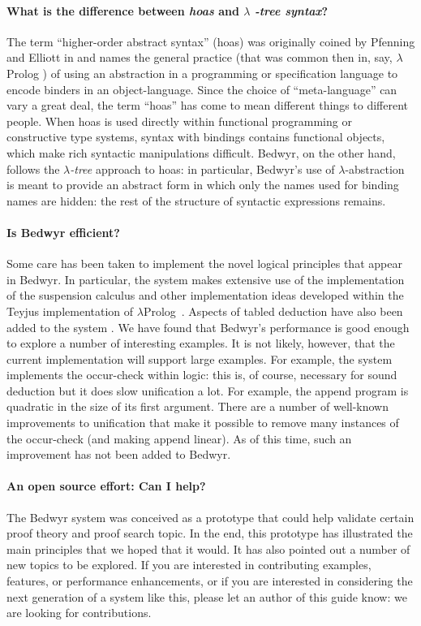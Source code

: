 \documentclass{article}
\newcommand{\lp}{$\lambda$Prolog}
\begin{document}
\paragraph{What is the difference between {\em hoas} and $\lambda${\em
    -tree syntax}?}
The term ``higher-order abstract syntax'' (hoas) was originally coined
by Pfenning and Elliott in \cite{pfenning88pldi} and names the general
practice (that was common then in, say, $\lambda$Prolog
\cite{miller87slp}) of using an abstraction in a programming or
specification language to encode binders in an object-language.  Since
the choice of ``meta-language'' can vary a great deal, the term
``hoas'' has come to mean different things to different people.  When
hoas is used directly within functional programming or constructive
type systems, syntax with bindings contains functional objects, which
make rich syntactic manipulations difficult.  Bedwyr, on the other
hand, follows the {\em $\lambda$-tree} approach \cite{miller00cl} to
hoas: in particular, Bedwyr's use of $\lambda$-abstraction is meant to
provide an abstract form in which only the names used for binding
names are hidden: the rest of the structure of syntactic expressions
remains.

\paragraph{Is Bedwyr efficient?}
Some care has been taken to implement the novel logical principles
that appear in Bedwyr.  In particular, the system makes extensive use
of the implementation of the suspension calculus \cite{nadathur99jflp}
and other implementation ideas developed within the Teyjus
\cite{nadathur99cade} implementation of \lp\ \cite{nadathur88iclp}.
Aspects of tabled deduction have also been added to the system
\cite{ramakrishna97cav,pientka05cade}.  We have found that Bedwyr's
performance is good enough to explore a number of interesting
examples.  It is not likely, however, that the current implementation
will support large examples.  For example, the system implements the
occur-check within logic: this is, of course, necessary for sound
deduction but it does slow unification a lot.  For example, the append
program is quadratic in the size of its first argument.  There are a
number of well-known improvements to unification that make it possible
to remove many instances of the occur-check (and making append
linear).  As of this time, such an improvement has not been added to
Bedwyr.

\paragraph{An open source effort: Can I help?}
The Bedwyr system was conceived as a prototype that could help
validate certain proof theory and proof search topic.  In the end,
this prototype has illustrated the main principles that we hoped that
it would.  It has also pointed out a number of new topics to be
explored.  If you are interested in contributing examples, features,
or performance enhancements, or if you are interested in considering
the next generation of a system like this, please let an author of
this guide know: we are looking for contributions.
\end{document}
